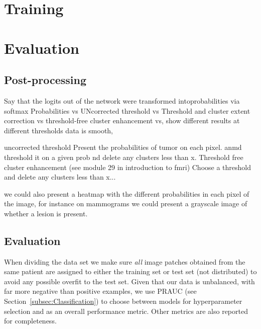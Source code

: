 \section{Training}


\section{Evaluation}

\subsection{Post-processing}
Say that the logits out of the network were transformed intoprobabilities via softmax
Probabilities vs UNcorrected threshold vs Threshold and cluster extent correction vs threshold-free cluster enhancement vs, show different results at different thresholds
data is smooth, 

uncorrected threshold
Present the probabilities of tumor on each pixel. anmd threshold it on a given prob nd delete any clusters less than x.
Threshold free cluster enhancement (see module 29 in introduction to fmri)
Choose a threshold and delete any clusters less than x...

we could also present a heatmap with the different probabilities in each pixel of the image, for instance on mammograms we could present a grayscale image of whether a lesion is present.






	\subsection{Evaluation}
	When dividing the data set we make sure \textit{all} image patches obtained from the same patient are assigned to either the training set or test set (not distributed) to avoid any possible overfit to the test set. Given that our data is unbalanced, with far more negative than positive examples, we use PRAUC (see Section~\ref{subsec:Classification}) to choose between models for hyperparameter selection and as an overall performance metric. Other metrics are also reported for completeness. 

